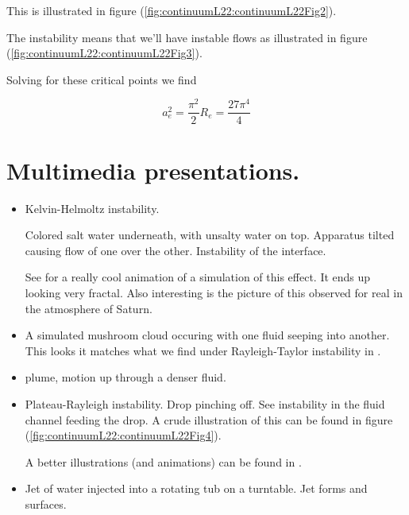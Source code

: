 This is illustrated in figure (\ref{fig:continuumL22:continuumL22Fig2}).


The instability means that we'll have instable flows as illustrated in figure (\ref{fig:continuumL22:continuumL22Fig3}).


Solving for these critical points we find

\begin{subequations}
\begin{equation}\label{eqn:continuumL22:530}
a_e^2 = \frac{\pi^2}{2}
\end{equation}
\begin{equation}\label{eqn:continuumL22:550}
R_e = \frac{27 \pi^4}{4}
\end{equation}
\end{subequations}


\section{Multimedia presentations.}

\begin{itemize}
\item Kelvin-Helmoltz instability.

Colored salt water underneath, with unsalty water on top.  Apparatus tilted causing flow of one over the other.  Instability of the interface.

See \cite{wiki:KelvinHelmholtz} for a really cool animation of a simulation of this effect.  It ends up looking very fractal.  Also interesting is the picture of this observed for real in the atmosphere of Saturn.

\item A simulated mushroom cloud occuring with one fluid seeping into another.  This looks it matches what we find under Rayleigh-Taylor instability in \cite{wiki:RayleighTaylor}.

\item plume, motion up through a denser fluid.

\item Plateau-Rayleigh instability.  Drop pinching off.  See instability in the fluid channel feeding the drop.  A crude illustration of this can be found in figure (\ref{fig:continuumL22:continuumL22Fig4}).


A better illustrations (and animations) can be found in \cite{wiki:PlateauRayleigh}.

\item Jet of water injected into a rotating tub on a turntable.  Jet forms and surfaces.

\end{itemize}

\EndArticle
